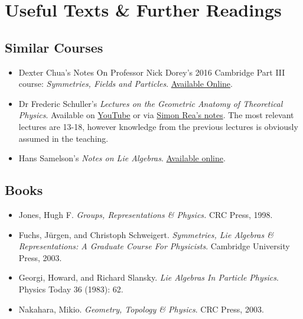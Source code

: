 \chapter*{Useful Texts \& Further Readings}

\section*{Similar Courses}
\begin{itemize}
    \item Dexter Chua's Notes On Professor Nick Dorey’s 2016 Cambridge Part III course: \textit{Symmetries, Fields and Particles}. \href{https://dec41.user.srcf.net/notes/III_M/symmetries_fields_and_particles.pdf}{Available Online}.
    \item Dr Frederic Schuller's \textit{Lectures on the Geometric Anatomy of Theoretical Physics}. Available on  \href{https://www.youtube.com/watch?v=V49i_LM8B0E&list=PLPH7f_7ZlzxTi6kS4vCmv4ZKm9u8g5yic}{YouTube} or via \href{https://mathswithphysics.blogspot.com/2016/07/lectures-on-geometric-anatomy-of.html}{Simon Rea's notes}. The most relevant lectures are 13-18, however knowledge from the previous lectures is obviously assumed in the teaching.
    \item Hans Samelson's \textit{Notes on Lie Algebras}. \href{https://pi.math.cornell.edu/~hatcher/Other/Samelson-LieAlg.pdf}{Available online}.
\end{itemize}

\section*{Books}
\begin{itemize}
    \item Jones, Hugh F. \textit{Groups, Representations \& Physics.} CRC Press, 1998.
    \item Fuchs, J\"{u}rgen, and Christoph Schweigert. \textit{Symmetries, Lie Algebras \& Representations: A Graduate Course For Physicists}. Cambridge University Press, 2003.
    \item Georgi, Howard, and Richard Slansky. \textit{Lie Algebras In Particle Physics}. Physics Today 36 (1983): 62.
    \item Nakahara, Mikio. \textit{Geometry, Topology \& Physics}. CRC Press, 2003.
\end{itemize}